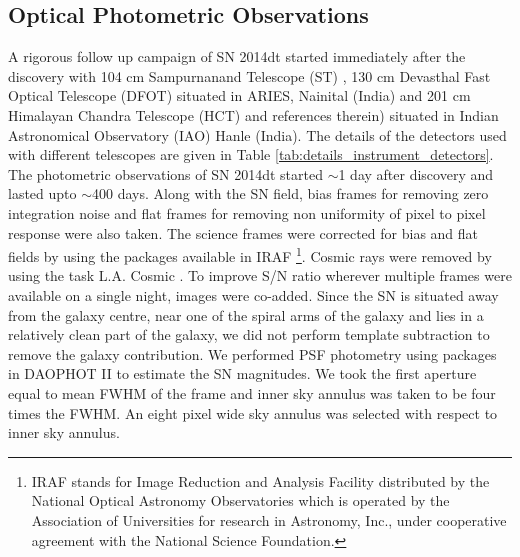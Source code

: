\documentclass[fleqn,usenatbib]{mnras}
\begin{document}
\subsection{Optical Photometric Observations}
A rigorous follow up campaign of SN 2014dt started immediately after the discovery with 104 cm Sampurnanand Telescope (ST) \citep{1999CSci...77..643G}, 130 cm Devasthal Fast Optical Telescope (DFOT) \citep{2012SPIE.8444E..1TS} situated in ARIES, Nainital (India) and 201 cm Himalayan Chandra Telescope (HCT) \cite{2010ASInC...1..193P} and references therein) situated in Indian Astronomical Observatory (IAO) Hanle (India). The details of the detectors used with different telescopes are given in Table \ref{tab:details_instrument_detectors}. The photometric observations of SN 2014dt started $\sim$1 day after discovery and lasted upto $\sim$400 days. Along with the SN field, bias frames for removing zero integration noise and flat frames for removing non uniformity of pixel to pixel response were also taken. The science frames were corrected for bias and flat fields by using the packages available in IRAF \footnote{IRAF
stands for Image Reduction and Analysis Facility distributed by the National Optical Astronomy Observatories which is operated by the Association of Universities for research in Astronomy, Inc., under cooperative agreement with the National Science Foundation.}. Cosmic rays were removed by using the task L.A. Cosmic \citep{2001PASP..113.1420V}. To improve S/N ratio wherever multiple frames were available on a single night, images were co-added. Since the SN is situated away from the galaxy centre, near one of the spiral arms of the galaxy and lies in a relatively clean part of the galaxy, we did not perform template subtraction to remove the galaxy contribution. We performed PSF photometry using packages in DAOPHOT II \citep{1987PASP...99..191S}  to estimate the SN magnitudes. We took the first aperture equal to mean FWHM of the frame and inner sky annulus was taken to be four times the FWHM. An eight pixel wide sky annulus was selected with respect to inner sky annulus.
\end{document}

